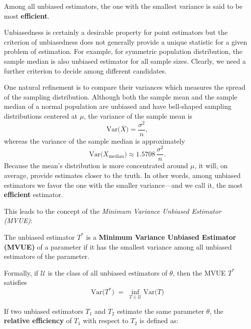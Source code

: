 \documentclass[twoside]{book}
\begin{document}
\begin{enumerate}
    \begin{textbox}
    Among all unbiased estimators, the one with the smallest variance is said to be most \textbf{efficient}.
    \end{textbox}
    
    Unbiasedness is certainly a desirable property for point estimators but the criterion of unbiasedness does not generally provide a unique statistic for a given problem of estimation. For example, for symmetric population distribution, the sample median is also unbiased estimator for all sample sizes. Clearly, we need a further criterion to decide among different candidates.
        
    One natural refinement is to compare their variances which measures the spread
     of the sampling distribution. Although both the sample mean and the sample median of a normal population are unbiased and have bell‐shaped sampling distributions centered at \(\mu\), the variance of the sample mean is
        \[
        \mathrm{Var}\bigl(\overline{X}\bigr) = \frac{\sigma^2}{n},
        \]
        whereas the variance of the sample median is approximately
        \[
        \mathrm{Var}\bigl(X_{\text{median}}\bigr) \approx 1.5708\,\frac{\sigma^2}{n}.
        \]
        Because the mean’s distribution is more concentrated around \(\mu\), it will, on average, provide estimates closer to the truth. In other words, among unbiased estimators we favor the one with the smaller variance—and we call it, the most \textbf{efficient} estimator.
        
        This leads to the concept of the \emph{Minimum Variance Unbiased Estimator (MVUE)}:
        
        \begin{textbox}     
        The unbiased estimator $T^*$ is a \textbf{Minimum Variance Unbiased Estimator (MVUE)} of a parameter if it has the smallest variance among all unbiased estimators of the parameter.
        
        Formally, if \(\mathcal{U}\) is the class of all unbiased estimators of \(\theta\), then the MVUE \(T^*\) satisfies
                \[
                \mathrm{Var}\bigl(T^*\bigr) \;=\; \inf_{T \in \mathcal{U}} \mathrm{Var}\bigl(T\bigr)
                \]
            \end{textbox}
                               
        If two unbiased estimators $T_1$ and $T_2$ estimate the same parameter $\theta$, the \textbf{relative efficiency} of $T_1$ with respect to $T_2$ is defined as:
        

\end{enumerate}
\end{document}
